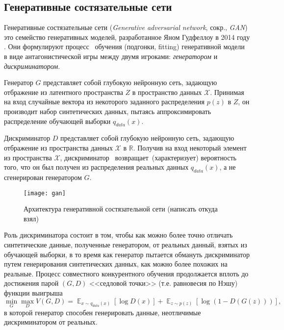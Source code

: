 \label{sec:relatedworks}
\subsection{Генеративные состязательные сети}

Генеративные состязательные сети (\emph{Generative adversarial network}, сокр., \emph{GAN})  это семейство генеративных моделей, разработанное Яном Гудфеллоу в 2014 году \cite{goodfellow2014generative}.  Они формулируют процесс ~обучения (подгонки, fitting) генеративной модели~ в виде антагонистической игры между двумя игроками: \emph{генератором} и \emph{дискриминатором}.

Генератор $G$ представляет собой глубокую нейронную сеть, задающую отбражение из латентного пространства $Z$ в пространство данных $\mathcal X$.
Принимая на вход случайные вектора из некоторого заданного распределения $p(z)$ в $Z$, он производит набор синтетических данных, пытаясь аппроксимировать распределение обучающей выборки $q_{data}(x)$.

Дискриминатор $D$ представляет собой глубокую нейронную сеть, задающую отбражение из пространства данных $\mathcal X$ в $\mathbb R$. Получив на вход некоторый элемент из пространства $\mathcal X$, дискриминатор ~возвращает~(характеризует) вероятность того, что он был получен из распределения реальных данных $q_{data}(x)$, а не сгенерирован генератором $G$.

\begin{figure}[h]
\begin{center}
    \texttt{[image: gan]}
    \caption{Архитектура генеративной состязательной сети (написать откуда взял)}
    \label{fig:subim11}
\end{center}
\end{figure}

Роль дискриминатора состоит в том, чтобы как можно более точно отличать синтетические данные, полученные генератором, от реальных данный, взятых из обучающей выборки, в то время как генератор пытается обмануть дискриминатор путем генерирования синтетических данных, как можно более похожих на реальные.
Процесс совместного конкурентного обучения продолжается вплоть до достижения парой $(G, D)$ <<седловой точки>> (т.е. равновесия по Нэшу) \cite{goodfellow2017nips} функции выигрыша
$$
\min_{G} \max_{D} V(G, D) = \mathop{\mathbb{E}}_{x \sim q_{data}(x)} [\log D(x)] + \mathop{\mathbb{E}}_{z \sim p(z)} [\log (1 - D(G(z)))] ,
$$
в которой генератор способен генерировать данные, неотличимые дискриминатором от реальных.

